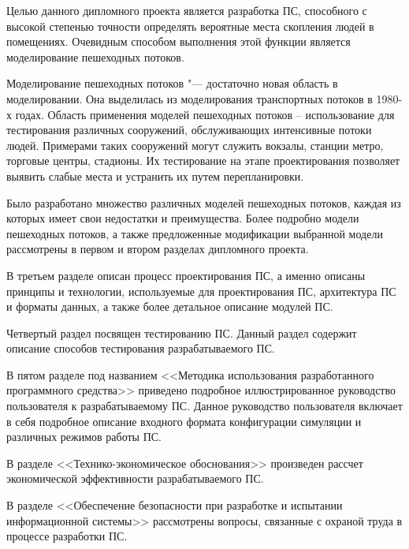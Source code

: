 \label{sec:intro}

Целью данного дипломного проекта является разработка ПС, способного с высокой степенью точности определять вероятные места скопления людей в помещениях.
Очевидным способом выполнения этой функции является моделирование пешеходных потоков.

Моделирование пешеходных потоков "--- достаточно новая область в моделировании. Она выделилась из моделирования транспортных потоков в 1980-х годах.
Область применения моделей пешеходных потоков – использование для тестирования различных сооружений, обслуживающих интенсивные потоки людей.
Примерами таких сооружений могут служить вокзалы, станции метро, торговые центры, стадионы. Их тестирование на этапе проектирования позволяет выявить слабые места и устранить их путем перепланировки.

Было разработано множество различных моделей пешеходных потоков, каждая из которых имеет свои недостатки и преимущества.
Более подробно модели пешеходных потоков, а также предложенные модификации выбранной модели рассмотрены в первом и втором разделах дипломного проекта.

В третьем разделе описан процесс проектирования ПС, а именно описаны принципы и технологии, используемые для проектирования ПС, архитектура ПС и форматы данных, а также более детальное описание модулей ПС.

Четвертый раздел посвящен тестированию ПС. Данный раздел содержит описание способов тестирования разрабатываемого ПС.

В пятом разделе под названием <<Методика использования разработанного программного средства>> приведено подробное иллюстрированное руководство пользователя к разрабатываемому ПС. Данное руководство пользователя включает в себя подробное описание входного формата конфигурации симуляции и различных режимов работы ПС.

В разделе <<Технико-экономическое обоснования>> произведен рассчет экономической эффективности разрабатываемого ПС.

В разделе <<Обеспечение безопасности при разработке и испытании информационной системы>> рассмотрены вопросы, связанные с охраной труда в процессе разработки ПС.
